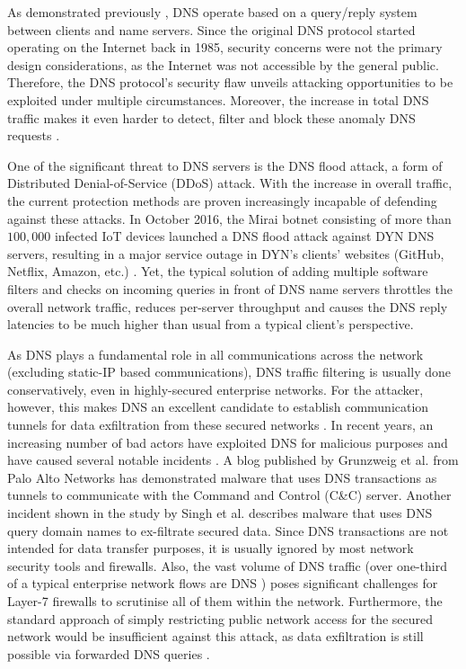 \documentclass[a4paper]{report}
\begin{document}
As demonstrated previously \cite{RFC-1034, RFC-1035}, DNS operate based on a query/reply system between clients and name servers. Since the original DNS protocol started operating on the Internet back in 1985, security concerns were not the primary design considerations, as the Internet was not accessible by the general public. Therefore, the DNS protocol's security flaw unveils attacking opportunities to be exploited under multiple circumstances\cite{antonakakis2010centralized}. Moreover, the increase in total DNS traffic makes it even harder to detect, filter and block these anomaly DNS requests \cite{kambourakis2007detecting}. 

One of the significant threat to DNS servers is the DNS flood attack, a form of Distributed Denial-of-Service (DDoS) attack. With the increase in overall traffic, the current protection methods are proven increasingly incapable of defending against these attacks. In October 2016, the Mirai botnet consisting of more than $100,000$ infected IoT devices launched a DNS flood attack against DYN DNS servers, resulting in a major service outage in DYN's clients' websites (GitHub, Netflix, Amazon, etc.) \cite{bisson-2016}. Yet, the typical solution of adding multiple software filters and checks on incoming queries in front of DNS name servers throttles the overall network traffic, reduces per-server throughput and causes the DNS reply latencies to be much higher than usual from a typical client's perspective\cite{Mahjabin-2020}.
 
As DNS plays a fundamental role in all communications across the network (excluding static-IP based communications), DNS traffic filtering is usually done conservatively, even in highly-secured enterprise networks. For the attacker, however, this makes DNS an excellent candidate to establish communication tunnels for data exfiltration from these secured networks \cite{nadler-201936}. In recent years, an increasing number of bad actors have exploited DNS for malicious purposes and have caused several notable incidents \cite{das-8260721}. A blog published by Grunzweig et al.\cite{grunzweig_scott_lee_2018} from Palo Alto Networks has demonstrated malware that uses DNS transactions as tunnels to communicate with the Command and Control (C\&C) server. Another incident shown in the study by Singh et al.\cite{singh-2016} describes malware that uses DNS query domain names to ex-filtrate secured data. Since DNS transactions are not intended for data transfer purposes, it is usually ignored by most network security tools and firewalls. Also, the vast volume of DNS traffic (over one-third of a typical enterprise network flows are DNS \cite{das-8260721}) poses significant challenges for Layer-7 firewalls to scrutinise all of them within the network. Furthermore, the standard approach of simply restricting public network access for the secured network would be insufficient against this attack, as data exfiltration is still possible via forwarded DNS queries \cite{bromberger2011dns}.
\end{document}

